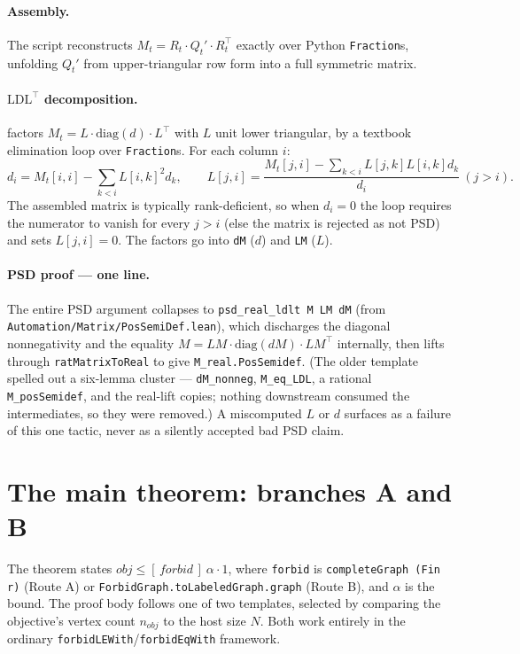 \documentclass[11pt]{article}
\newcommand{\btt}[1]{\texttt{\detokenize{#1}}}
\begin{document}
\paragraph{Assembly.}
The script reconstructs $M_t = R_t \cdot Q_t' \cdot R_t^\top$ exactly over Python
\texttt{Fraction}s, unfolding $Q_t'$ from upper-triangular row form into a full
symmetric matrix.

\paragraph{$\mathrm{LDL}^\top$ decomposition.}
\btt{ldl_decomposition} factors $M_t = L\cdot\mathrm{diag}(d)\cdot L^\top$ with
$L$ unit lower triangular, by a textbook elimination loop over
\texttt{Fraction}s. For each column $i$:
\[
  d_i = M_t[i,i] - \sum_{k<i} L[i,k]^2 d_k, \qquad
  L[j,i] = \frac{M_t[j,i] - \sum_{k<i} L[j,k]L[i,k]d_k}{d_i}\ (j>i).
\]
The assembled matrix is typically rank-deficient, so when $d_i = 0$ the loop
requires the numerator to vanish for every $j>i$ (else the matrix is rejected as
not PSD) and sets $L[j,i]=0$. The factors go into \texttt{dM} ($d$) and
\texttt{LM} ($L$).

\paragraph{PSD proof --- one line.}
The entire PSD argument collapses to \texttt{psd\_real\_ldlt M LM dM} (from
\texttt{Auto\-mation/Matrix/PosSemiDef.lean}), which discharges the diagonal
nonnegativity and the equality $M = LM\cdot\mathrm{diag}(dM)\cdot LM^\top$
internally, then lifts through \texttt{ratMatrixToReal} to give
\texttt{M\_real.PosSemidef}. (The older template spelled out a six-lemma cluster
--- \texttt{dM\_nonneg}, \texttt{M\_eq\_LDL}, a rational \texttt{M\_posSemidef},
and the real-lift copies; nothing downstream consumed the intermediates, so they
were removed.) A miscomputed $L$ or $d$ surfaces as a failure of this one tactic,
never as a silently accepted bad PSD claim.

\section{The main theorem: branches A and B}
\label{sec:body}

The theorem states $\mathit{obj} \le[\,\mathit{forbid}\,]\ \alpha\cdot 1$, where
\texttt{forbid} is \texttt{completeGraph (Fin r)} (Route A) or
\texttt{ForbidGraph.toLabeledGraph.graph} (Route B), and $\alpha$ is the bound.
The proof body follows one of two templates, selected by comparing the
objective's vertex count $n_{\mathit{obj}}$ to the host size $N$. Both work
entirely in the ordinary \texttt{forbidLEWith}/\texttt{forbidEqWith} framework.
\end{document}
